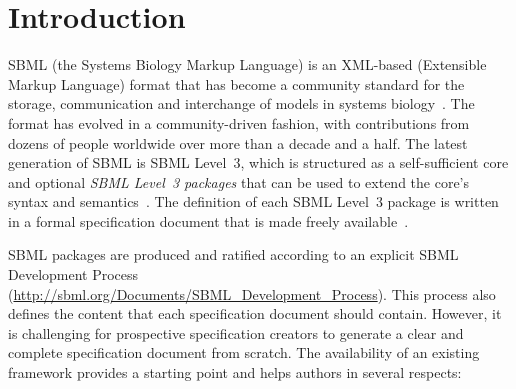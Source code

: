 \documentclass{bmcart}
\begin{document}


\section*{Introduction}

SBML (the Systems Biology Markup Language) is an XML-based (Extensible Markup Language) format that has become a community standard for the storage, communication and interchange of models in systems biology~\cite{hucka2003the, waltemath2014meeting}.  The format has evolved in a community-driven fashion, with contributions from dozens of people worldwide over more than a decade and a half.  The latest generation of SBML is SBML Level~3, which is structured as a self-sufficient core and optional \emph{SBML Level~3 packages} that can be used to extend the core's syntax and semantics~\cite{hucka2015the}.  The definition of each SBML Level~3 package is written in a formal specification document that is made freely available~\cite{schreiber2015specifications, schreiber2016specifications}.

SBML packages are produced and ratified according to an explicit SBML Development Process (\url{http://sbml.org/Documents/SBML_Development_Process}).  This process also defines the content that each specification document should contain.  However, it is challenging for prospective specification creators to generate a clear and complete specification document from scratch.  The availability of an existing framework provides a starting point and helps authors in several respects:
\end{document}

